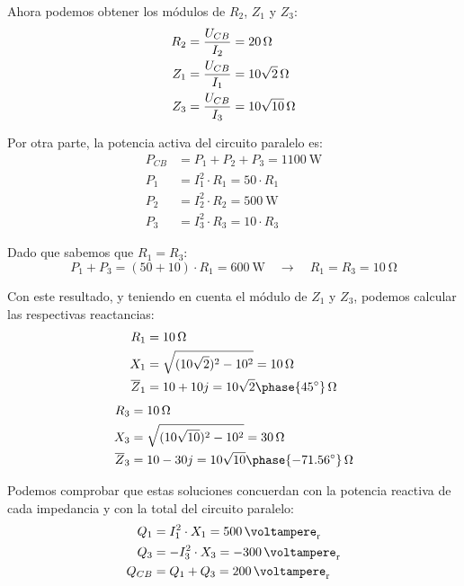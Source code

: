 \vspace{2mm}
Ahora podemos obtener los módulos de $R_2$, $Z_1$ y $Z_3$:
\begin{align*}
  R_2 &= \frac{U_{CB}}{I_2} = \qty{20}{\ohm}\\
  Z_1 &= \frac{U_{CB}}{I_1} = \qty[parse-numbers=false]{10\sqrt{2}}{\ohm}\\
  Z_3 &= \frac{U_{CB}}{I_3} = \qty[parse-numbers=false]{10\sqrt{10}}{\ohm}
\end{align*}

Por otra parte, la potencia activa del circuito paralelo es:
\begin{align*}
  P_{CB} &= P_1 + P_2 + P_3 =\qty{1100}{\watt}\\
  P_1 &= I_1^2 \cdot R_1 = 50 \cdot R_1\\
  P_2 &= I_2^2 \cdot R_2 = \qty{500}{\watt}\\
  P_3 &= I_3^2 \cdot R_3 = 10 \cdot R_3
\end{align*}

Dado que sabemos que $R_1 = R_3$: 
\[
   P_1 + P_3 = (50+10) \cdot R_1 = \qty{600}{\watt} \quad \rightarrow \quad R_1 = R_3 = \qty{10}{\ohm}              
\]

Con este resultado, y teniendo en cuenta el módulo de $Z_1$ y $Z_3$,
podemos calcular las respectivas reactancias:
\begin{align*}
  R_1 &= \qty{10}{\ohm}\\
  X_1 &= \sqrt{(10\sqrt2)^2 - 10^2} = \qty{10}{\ohm}\\
  \overline{Z}_1 &= 10 + 10j = {10\sqrt{2}\phase{\ang{45}}}\,\si{\ohm}
\end{align*}
\begin{align*}
  R_3 &= \qty{10}{\ohm}\\
  X_3 &= \sqrt{(10\sqrt{10})^2 - 10^2} = \qty{30}{\ohm}\\
  \overline{Z}_3 &= 10 - 30j = {10\sqrt{10}\phase{\ang{-71.56}}}\,\si{\ohm}
\end{align*}

Podemos comprobar que estas soluciones concuerdan con la potencia
reactiva de cada impedancia y con la total del circuito paralelo:
\begin{align*}
  Q_1 &= I_1^2 \cdot X_1 = \qty{500}{\voltampere_r}\\
  Q_3 &= - I_3^2 \cdot X_3 = \qty{-300}{\voltampere_r}\\
  Q_{CB} &= Q_1 + Q_3 =\qty{200}{\voltampere_r}
\end{align*}

